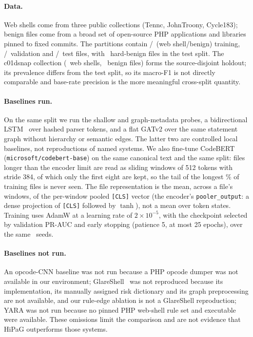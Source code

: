 \documentclass[pdflatex,sn-mathphys-num]{sn-jnl}
\begin{document}
\paragraph{Data.} Web shells come from three public collections (Tennc,
JohnTroony, Cycle183); benign files come from a broad set of open-source PHP
applications and libraries pinned to fixed commits. The partitions contain
\NTrainPos/\NTrainNeg\ (web shell/benign) training, \NValPos/\NValNeg\
validation and \NTestPos/\NTestNeg\ test files, with \NHardBenignTest\
hard-benign files in the test split. The c01dsnap collection (\NHoldoutPos\ web
shells, \NHoldoutNeg\ benign files) forms the source-disjoint holdout; its
prevalence differs from the test split, so its macro-F1 is not directly
comparable and base-rate precision is the more meaningful cross-split quantity.

\paragraph{Baselines run.} On the same split we run the shallow and
graph-metadata probes, a bidirectional LSTM~\cite{hochreiter1997lstm} over
hashed parser tokens, and a flat GATv2 over the same statement graph without
hierarchy or semantic edges. The latter two are controlled local baselines,
not reproductions of named systems. We also fine-tune
CodeBERT~\cite{feng2020codebert} (\texttt{microsoft/codebert-base}) on the same
canonical text and the same split: files longer than the encoder limit are read
as sliding windows of 512 tokens with stride 384, of which only the first eight
are kept, so the tail of the longest \CodeBertTruncatedTrainPct\% of training
files is never seen. The file representation is the mean, across a file's
windows, of the per-window pooled \texttt{[CLS]} vector (the encoder's
\texttt{pooler\_output}: a dense projection of \texttt{[CLS]} followed by
$\tanh$), not a mean over token states. Training uses AdamW at a
learning rate of $2\times10^{-5}$, with the checkpoint selected by validation
PR-AUC and early stopping (patience 5, at most 25 epochs), over the same
\RqOneSeeds\ seeds.

\paragraph{Baselines not run.} An opcode-CNN baseline was not run because a PHP
opcode dumper was not available in our environment;
GlareShell~\cite{glareshell2024} was not reproduced because
its implementation, its manually assigned risk dictionary and its graph
preprocessing are not available, and our rule-edge ablation is not a GlareShell
reproduction; YARA was not run because no pinned PHP web-shell rule set and
executable were available. These omissions limit the comparison and are not
evidence that HiPaG outperforms those systems.
\end{document}
